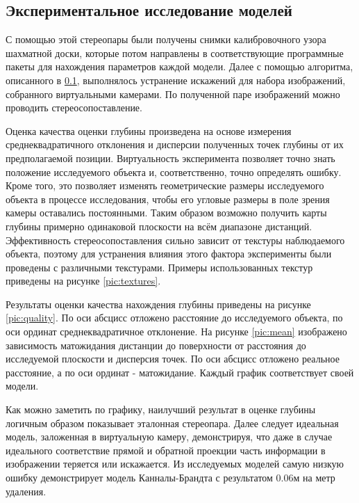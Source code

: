\subsection{Экспериментальное исследование моделей}

С помощью этой стереопары были получены снимки калибровочного узора шахматной доски, 
которые потом  направлены в соответствующие программные пакеты для нахождения параметров каждой модели. Далее с помощью алгоритма, описанного в \ref{},				%
выполнялось устранение искажений для набора изображений, собранного виртуальными камерами. По полученной паре изображений 
можно проводить стереосопоставление.

Оценка качества оценки глубины произведена на основе измерения среднеквадратичного отклонения и дисперсии полученных точек 
глубины от их предполагаемой позиции. Виртуальность эксперимента позволяет точно знать положение исследуемого объекта и, соответственно, 
точно определять ошибку. Кроме того, это позволяет изменять геометрические размеры исследуемого объекта в процессе исследования, чтобы его
угловые размеры в поле зрения камеры оставались постоянными. Таким образом возможно получить карты глубины примерно одинаковой 
плоскости на всём диапазоне дистанций.  Эффективность стереосопоставления \cite{SGBM} сильно зависит от текстуры наблюдаемого объекта, 
поэтому для устранения влияния этого фактора эксперименты были проведены с различными текстурами. 
Примеры использованных текстур приведены на рисунке \ref{pic:textures}. 


Результаты оценки качества нахождения глубины приведены на рисунке \ref{pic:quality}. По оси абсцисс отложено расстояние до исследуемого объекта,
по оси ординат среднеквадратичное отклонение. На рисунке \ref{pic:mean} изображено зависимость матожидания дистанции до поверхности от расстояния 
до исследуемой плоскости и дисперсия точек. По оси абсцисс отложено реальное расстояние, а по оси ординат - матожидание. Каждый график соответствует своей модели.



Как можно заметить по графику, наилучший результат в оценке глубины логичным образом показывает эталонная стереопара. Далее следует 
идеальная модель, заложенная в виртуальную камеру, демонстрируя, что даже в случае идеального соответствие прямой и обратной проекции часть 
информации в изображении теряется или искажается. Из исследуемых моделей самую низкую ошибку демонстрирует модель Канналы-Брандта с результатом
0.06м на метр удаления. 

